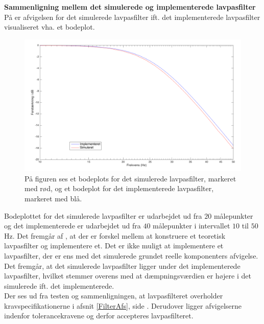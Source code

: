 \noindent\textbf{Sammenligning mellem det simulerede og implementerede lavpasfilter} \\
\noindent På  er afvigelsen for det simulerede lavpasfilter ift. det implementerede lavpasfilter visualiseret vha. et bodeplot. 
\begin{figure}[H]
	\centering
	\includegraphics[scale=0.4]{figures/cProblemloesning/sammenligning_sim_imp.PNG}
	\caption{På figuren ses et bodeplots for det simulerede lavpasfilter, markeret med rød, og et bodeplot for det implementerede lavpasfilter, markeret med blå.}
	\label{fig:sammenligning_sim_imp}
\end{figure}
\noindent Bodeplottet for det simulerede lavpasfilter er udarbejdet ud fra $20$ målepunkter og det implementerede er udarbejdet ud fra $40$ målepunkter i intervallet $10$ til $50$Hz. Det fremgår af , at der er forskel mellem at konstruere et teoretisk lavpasfilter og implementere et. Det er ikke muligt at implementere et lavpasfilter, der er ens med det simulerede grundet reelle komponenters afvigelse. Det fremgår, at det simulerede lavpasfilter ligger under det implementerede lavpasfilter, hvilket stemmer overens med at dæmpningsværdien er højere i det simulerede ift. det implementerede. \\
Der ses ud fra testen og sammenligningen, at lavpasfilteret overholder kravspecifikationerne i afsnit \ref{FilterAfs}, side \pageref{FilterAfs}. Derudover ligger afvigelserne indenfor tolerancekravene og derfor accepteres lavpasfilteret. 